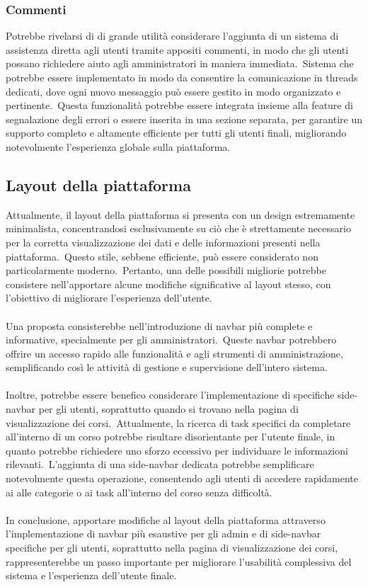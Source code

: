 \subsubsection{Commenti}
Potrebbe rivelarsi di di grande utilità considerare l'aggiunta di un sistema di assistenza diretta agli utenti 
tramite appositi commenti, in modo che gli utenti possano richiedere aiuto agli amministratori in maniera immediata.\ 
Sistema che potrebbe essere implementato in modo da consentire la comunicazione in threads dedicati, dove 
ogni nuovo messaggio può essere gestito in modo organizzato e pertinente.\ 
Questa funzionalità potrebbe essere integrata insieme alla feature di segnalazione degli errori o essere 
inserita in una sezione separata, per garantire un supporto completo e altamente efficiente per tutti gli utenti finali, 
migliorando notevolmente l'esperienza globale sulla piattaforma.
%
\subsection{Layout della piattaforma}\label{sec:cap_sec_subsec}
Attualmente, il layout della piattaforma si presenta con un design estremamente minimalista, 
concentrandosi esclusivamente su ciò che è strettamente necessario per la corretta visualizzazione 
dei dati e delle informazioni presenti nella piattaforma.\ Questo stile, sebbene efficiente, 
può essere considerato non particolarmente moderno.\ Pertanto, una delle possibili migliorie potrebbe 
consistere nell'apportare alcune modifiche significative al layout stesso, con l'obiettivo di migliorare l'esperienza dell'utente.
\\ \\
Una proposta consisterebbe nell'introduzione di navbar più complete e informative, specialmente per gli amministratori.\ 
Queste navbar potrebbero offrire un accesso rapido alle funzionalità e agli strumenti di amministrazione, 
semplificando così le attività di gestione e supervisione dell'intero sistema.
\\ \\
Inoltre, potrebbe essere benefico considerare l'implementazione di specifiche side-navbar per gli utenti, 
soprattutto quando si trovano nella pagina di visualizzazione dei corsi.\ 
Attualmente, la ricerca di task specifici da completare all'interno di un corso potrebbe risultare disorientante per l'utente finale, 
in quanto potrebbe richiedere uno sforzo eccessivo per individuare le informazioni rilevanti.\ 
L'aggiunta di una side-navbar dedicata potrebbe semplificare notevolmente questa operazione, 
consentendo agli utenti di accedere rapidamente ai alle categorie o ai task all'interno del corso senza difficoltà.
\\ \\
In conclusione, apportare modifiche al layout della piattaforma attraverso l'implementazione di navbar 
più esaustive per gli admin e di side-navbar specifiche per gli utenti, soprattutto nella pagina di visualizzazione dei corsi, 
rappresenterebbe un passo importante per migliorare l'usabilità complessiva del sistema e l'esperienza dell'utente finale.
%
